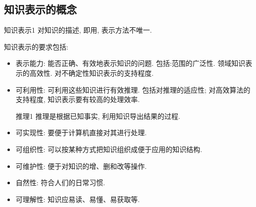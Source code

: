 \subsection{知识表示的概念}
\begin{mydef}{知识表示}{1}
对知识的描述, 即用, 表示方法不唯一.
\end{mydef}

知识表示的要求包括:
\begin{itemize}
\item 表示能力: 能否正确、有效地表示知识的问题. 包括:范围的广泛性. 领域知识表示的高效性. 对不确定性知识表示的支持程度.
\item 可利用性: 可利用这些知识进行有效推理. 包括对推理的适应性; 对高效算法的支持程度, 知识表示要有较高的处理效率.

\begin{mydef}{推理}{1}
    推理是根据已知事实, 利用知识导出结果的过程.
\end{mydef}
\item 可实现性: 要便于计算机直接对其进行处理.
\item 可组织性: 可以按某种方式把知识组织成便于应用的知识结构.
\item 可维护性: 便于对知识的增、删和改等操作.
\item 自然性: 符合人们的日常习惯.
\item 可理解性: 知识应易读、易懂、易获取等.
\end{itemize}
